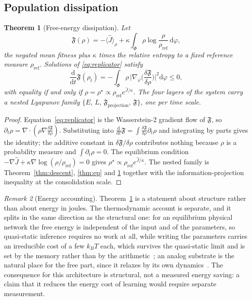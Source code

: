 \documentclass[11pt]{article}
\newtheorem{theorem}{Theorem}
\theoremstyle{definition}
\theoremstyle{remark}
\newtheorem{remark}[theorem]{Remark}
\newcommand{\cF}{\mathfrak{F}}
\begin{document}
\subsection{Population dissipation}
\begin{theorem}[Free-energy dissipation]
\label{thm:dissipation}
Let
\begin{equation}
\cF(\rho)=-\langle\hat J\rangle_\rho+\kappa\!\int_\Phi\rho\log\frac{\rho}{\rho_{\text{ref}}}\,\mathrm d\varphi,
\label{eq:freeenergy}
\end{equation}
the negated mean fitness plus $\kappa$ times the relative entropy to a fixed reference measure
$\rho_{\text{ref}}$. Solutions of \eqref{eq:replicator} satisfy
\begin{equation}
\frac{\mathrm d}{\mathrm dt}\cF(\rho_t)=-\int_\Phi\rho\,\Big|\nabla_\varphi\Big(\frac{\delta\cF}{\delta\rho}\Big)\Big|^2\mathrm d\varphi\le0,
\end{equation}
with equality if and only if $\rho=\rho^\star\propto\rho_{\text{ref}}e^{\hat J/\kappa}$. The four layers
of the system carry a nested Lyapunov family $\{E,\,L,\,\cF_{\text{projection}},\,\cF\}$, one per time
scale.
\end{theorem}
\begin{proof}
Equation~\eqref{eq:replicator} is the Wasserstein-2 gradient flow of $\cF$, so
$\partial_t\rho=\nabla\cdot(\rho\nabla\frac{\delta\cF}{\delta\rho})$. Substituting into
$\frac{\mathrm d}{\mathrm dt}\cF=\int\frac{\delta\cF}{\delta\rho}\partial_t\rho$ and integrating by
parts gives the identity; the additive constant in $\delta\cF/\delta\rho$ contributes nothing because
$\rho$ is a probability measure and $\int\partial_t\rho=0$. The equilibrium condition
$-\nabla\hat J+\kappa\nabla\log(\rho/\rho_{\text{ref}})=0$ gives
$\rho^\star\propto\rho_{\text{ref}}e^{\hat J/\kappa}$. The nested family
is Theorem~\ref{thm:descent}, \ref{thm:ep} and \ref{thm:dissipation} together with the
information-projection inequality at the consolidation scale.
\end{proof}

\begin{remark}[Energy accounting]
Theorem~\ref{thm:dissipation} is a statement about structure rather than about energy in joules. The
thermodynamic account is separate, and it splits in the same direction as the structural one: for an
equilibrium physical network the free energy is independent of the input and of the parameters, so
quasi-static inference requires no work at all, while writing the parameters carries an irreducible
cost of a few $k_BT$ each, which survives the quasi-static limit and is set by the memory rather than by
the arithmetic~\cite{thermo_bounds}; an analog substrate is the natural place for the free part, since
it relaxes by its own dynamics~\cite{kendall2020}. The consequence for this architecture is
structural, not a measured energy saving: a claim that it reduces the energy cost of
learning would require separate measurement.
\end{remark}
\end{document}
